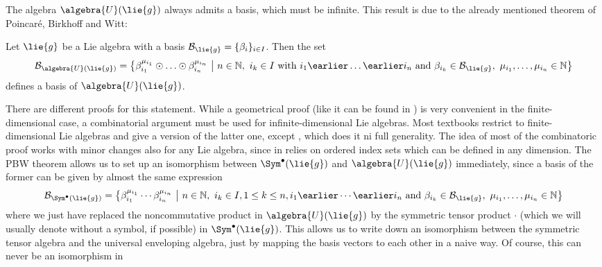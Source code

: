 The algebra $\algebra{U}(\lie{g})$ always admits a basis, which must be 
infinite. This result is due to the already mentioned theorem of 
Poincar\'e, Birkhoff and Witt:
\begin{theorem}
	\label{Thm:Alg:PBW}
	Let $\lie{g}$ be a Lie algebra with a basis $\mathcal{B}_{\lie{g}} = \{ 
	\beta_i \}_{i \in I}$. Then the set
	\begin{equation*}
		\mathcal{B}_{\algebra{U}(\lie{g})}
		=
		\big\{
			\beta_{i_1}^{\mu_{i_1}}
			\odot \ldots \odot
			\beta_{i_n}^{\mu_{i_n}}
		\ \big| \
			n \in \mathbb{N}, \ 
			i_k \in I
			\text{ with } i_1 \earlier \ldots \earlier i_n 
			\text{ and } \beta_{i_k} \in \mathcal{B}_{\lie{g}}, \
			\mu_{i_1}, \ldots, \mu_{i_n} \in \mathbb{N}
		\big\}
	\end{equation*}
	defines a basis of $\algebra{U}(\lie{g})$.
\end{theorem}
There are different proofs for this statement. While a geometrical proof 
(like it can be found in \cite{waldmann:2015a:script}) is very convenient 
in the finite-dimensional case, a combinatorial argument must be used for 
infinite-dimensional Lie algebras. Most textbooks restrict to 
finite-dimensional Lie algebras and give a version of the latter one, except 
\cite{bourbaki:1989a}, which does it ni full generality. The idea of most
of the combinatoric proof works with minor changes also for any Lie algebra,
since in relies on ordered index sets which can be defined in any dimension.
The PBW theorem allows us to set up an isomorphism between $\Sym^{\bullet}
(\lie{g})$ and $\algebra{U}(\lie{g})$ immediately, since a basis of the 
former can be given by almost the same expression
\begin{equation*}
	\mathcal{B}_{\Sym^{\bullet}(\lie{g})}
	=
	\big\{
		\beta_{i_1}^{\mu_{i_1}}
		\cdots
		\beta_{i_n}^{\mu_{i_n}}
	\ \big| \
		n \in \mathbb{N}, \ 
		i_k \in I, 1 \leq k \leq n,
		i_1 \earlier \cdots \earlier i_n 
		\text{ and } \beta_{i_k} \in \mathcal{B}_{\lie{g}}, \
		\mu_{i_1}, \ldots, \mu_{i_n} \in \mathbb{N}
	\big\}
\end{equation*}
where we just have replaced the noncommutative product in $\algebra{U}
(\lie{g})$ by the symmetric tensor product $\cdot$ (which we will usually 
denote without a symbol, if possible) in $\Sym^{\bullet}(\lie{g})$. This 
allows us to write down an isomorphism between the symmetric tensor algebra 
and the universal enveloping algebra, just by mapping the basis vectors to 
each other in a naive way. Of course, this can never be an isomorphism in 
